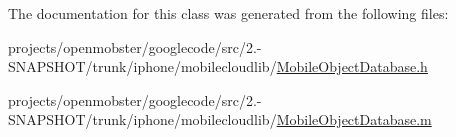 \-The documentation for this class was generated from the following files\-:\begin{DoxyCompactItemize}
\item 
projects/openmobster/googlecode/src/2.-\/\-S\-N\-A\-P\-S\-H\-O\-T/trunk/iphone/mobilecloudlib/\hyperlink{_mobile_object_database_8h}{\-Mobile\-Object\-Database.\-h}\item 
projects/openmobster/googlecode/src/2.-\/\-S\-N\-A\-P\-S\-H\-O\-T/trunk/iphone/mobilecloudlib/\hyperlink{_mobile_object_database_8m}{\-Mobile\-Object\-Database.\-m}\end{DoxyCompactItemize}
